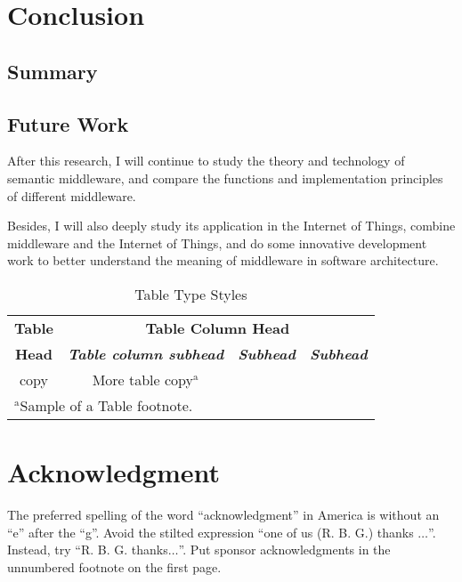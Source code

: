 \documentclass[conference]{IEEEtran}
\begin{document}
\section{Conclusion}

\subsection{Summary}



\subsection{Future Work}
After this research, I will continue to study the theory and technology of semantic middleware, and compare the functions and implementation principles of different middleware.

Besides, I will also deeply study its application in the Internet of Things, combine middleware and the Internet of Things, and do some innovative development work to better understand the meaning of middleware in software architecture.



\begin{table}[htbp]
\caption{Table Type Styles}
\begin{center}
\begin{tabular}{|c|c|c|c|}
\hline
\textbf{Table}&\multicolumn{3}{|c|}{\textbf{Table Column Head}} \\
\cline{2-4} 
\textbf{Head} & \textbf{\textit{Table column subhead}}& \textbf{\textit{Subhead}}& \textbf{\textit{Subhead}} \\
\hline
copy& More table copy$^{\mathrm{a}}$& &  \\
\hline
\multicolumn{4}{l}{$^{\mathrm{a}}$Sample of a Table footnote.}
\end{tabular}
\label{tab1}
\end{center}
\end{table}



\section*{Acknowledgment}

The preferred spelling of the word ``acknowledgment'' in America is without 
an ``e'' after the ``g''. Avoid the stilted expression ``one of us (R. B. 
G.) thanks $\ldots$''. Instead, try ``R. B. G. thanks$\ldots$''. Put sponsor 
acknowledgments in the unnumbered footnote on the first page.
\end{document}
